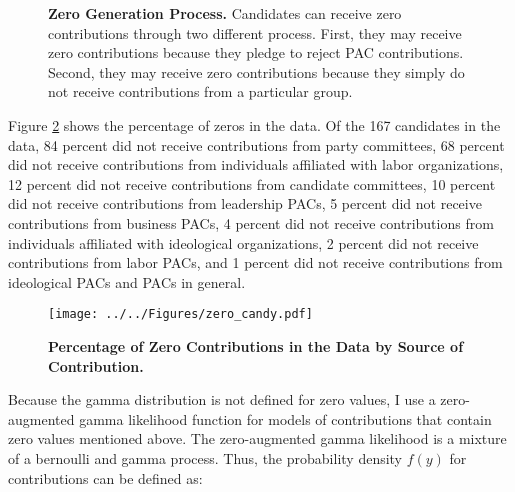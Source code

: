 \documentclass[12pt]{article}
\begin{document}
\begin{figure}[ht]
	\centering
	\caption{\textbf{Zero Generation Process.} Candidates can receive zero contributions through two different process. First, they may receive zero contributions because they pledge to reject PAC contributions. Second, they may receive zero contributions because they simply do not receive contributions from a particular group.}
	\label{fig: zeros}
\end{figure}

Figure \ref{fig: zeros} shows the percentage of zeros in the data. Of the 167 candidates in the data, 84 percent did not receive contributions from party committees, 68 percent did not receive contributions from individuals affiliated with labor organizations, 12 percent did not receive contributions from candidate committees, 10 percent did not receive contributions from leadership PACs, 5 percent did not receive contributions from business PACs,  4 percent did not receive contributions from individuals affiliated with ideological organizations, 2 percent did not receive contributions from labor PACs, and 1 percent did not receive contributions from ideological PACs and PACs in general.  

\begin{figure}[ht]
	\centering
	\texttt{[image: ../../Figures/zero\_candy.pdf]}
	\caption{\textbf{Percentage of Zero Contributions in the Data by Source of Contribution.}}
	\label{fig: zeros}
\end{figure}

Because the gamma distribution is not defined for zero values, I use a zero-augmented gamma likelihood function for models of contributions that contain zero values mentioned above. The zero-augmented gamma likelihood is a mixture of a bernoulli and gamma process. Thus, the probability density $f(y)$ for contributions can be defined as:    
\end{document}
